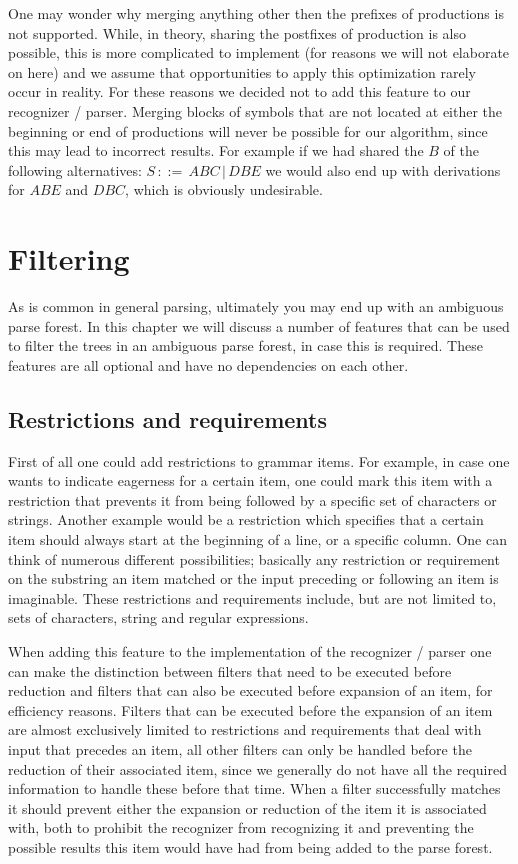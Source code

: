 \documentclass[a4paper,10pt]{article}
\begin{document}
One may wonder why merging anything other then the prefixes of productions is not supported. While, in theory, sharing the postfixes of production is also possible, this is more complicated to implement (for reasons we will not elaborate on here) and we assume that opportunities to apply this optimization rarely occur in reality. For these reasons we decided not to add this feature to our recognizer / parser. Merging blocks of symbols that are not located at either the beginning or end of productions will never be possible for our algorithm, since this may lead to incorrect results. For example if we had shared the $B$ of the following alternatives: $S\,::=\,ABC\,|\,DBE$ we would also end up with derivations for $ABE$ and $DBC$, which is obviously undesirable.

\pagebreak
\section{Filtering}
\label{chap:filtering}

As is common in general parsing, ultimately you may end up with an ambiguous parse forest. In this chapter we will discuss a number of features that can be used to filter the trees in an ambiguous parse forest, in case this is required. These features are all optional and have no dependencies on each other.

\subsection{Restrictions and requirements}

First of all one could add restrictions to grammar items. For example, in case one wants to indicate eagerness for a certain item, one could mark this item with a restriction that prevents it from being followed by a specific set of characters or strings. Another example would be a restriction which specifies that a certain item should always start at the beginning of a line, or a specific column. One can think of numerous different possibilities; basically any restriction or requirement on the substring an item matched or the input preceding or following an item is imaginable. These restrictions and requirements include, but are not limited to, sets of characters, string and regular expressions.

When adding this feature to the implementation of the recognizer / parser one can make the distinction between filters that need to be executed before reduction and filters that can also be executed before expansion of an item, for efficiency reasons. Filters that can be executed before the expansion of an item are almost exclusively limited to restrictions and requirements that deal with input that precedes an item, all other filters can only be handled before the reduction of their associated item, since we generally do not have all the required information to handle these before that time. When a filter successfully matches it should prevent either the expansion or reduction of the item it is associated with, both to prohibit the recognizer from recognizing it and preventing the possible results this item would have had from being added to the parse forest.
\end{document}
